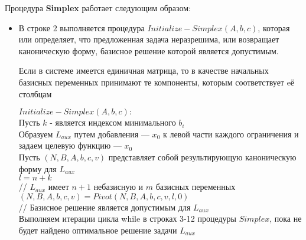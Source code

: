 \documentclass[../body.tex]{subfiles}
\begin{document}
Процедура \textbf{Simplex} работает следующим образом:
\begin{itemize}
	\item В строке $2$ выполняется процедура $Initialize-Simplex(A,b,c)$, которая или определяет, что предложенная задача неразрешима, или возвращает каноническую форму, базисное решение которой является допустимым.
	
	 Если в системе имеется единичная матрица, то в качестве начальных базисных переменных принимают те компоненты, которым соответствует eё столбцам\\

	 
	 	\begin{algorithm}[H]
	 	\textbf{$Initialize-Sim plex(A,b,c):$}\\
	 	Пусть $k$ - является индексом минимального $b_i$\\
	 	Образуем $  L_{aux}$ путем добавления — $x_{0}$ к левой части каждого
	 	ограничения и задаем целевую функцию — $x_{0}$\\
	 	Пусть $(N,B,A,b,c,v)$ представляет собой результирующую
	 	каноническую форму для $L_{aux}$
\\
	 	$l = n + k$\\
	 	// $L_{aux}$ имеет $n+1$ небазисную и $ m $ базисных переменных\\
	 	$(N ,B ,A ,b ,c ,v ) = Pivot(N,B, A ,b ,c ,v ,l,0 )$\\
	 	// Базисное решение является допустимым для $L_{aux}$ \\
	 	Выполняем итерации цикла while в строках 3-12 процедуры
	 	$Simplex$, пока не будет найдено оптимальное решение
	 	задачи $L_{aux}$
\\
\end{algorithm}
\end{itemize}
\end{document}
